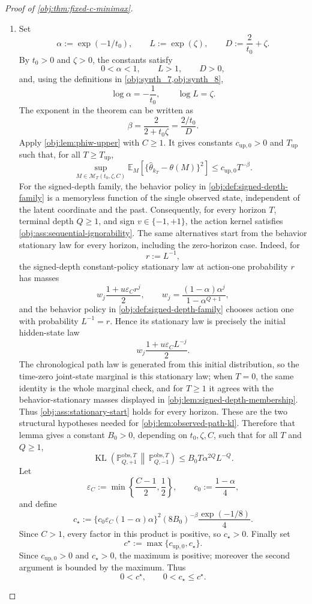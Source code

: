 \begin{proof}[Proof of \cref{obj:thm:fixed-c-minimax}]
\begin{enumerate}
\item Set
\[
\alpha:=\exp(-1/t_0),
\qquad
L:=\exp(\zeta),
\qquad
D:=\frac{2}{t_0}+\zeta .
\]
By \(t_0>0\) and \(\zeta>0\), the constants satisfy
\[
0<\alpha<1,\qquad L>1,\qquad D>0,
\]
and, using the definitions in \cref{obj:synth_7,obj:synth_8},
\[
\log\alpha=-\frac1{t_0},
\qquad
\log L=\zeta .
\]
The exponent in the theorem can be written as
\[
\beta=\frac{2}{2+t_0\zeta}
      =\frac{2/t_0}{D}.
\]
Apply \cref{obj:lem:phiw-upper} with \(C\ge1\). It gives constants
\(c_{\mathrm{up},0}>0\) and \(T_{\mathrm{up}}\) such that, for all
\(T\ge T_{\mathrm{up}}\),
\[
\sup_{M\in\mathcal M_T(t_0,\zeta,C)}
\mathbb E_M\!\left[
\{\widehat\theta_{k_T}-\theta(M)\}^2
\right]
\le
c_{\mathrm{up},0}T^{-\beta}.
\]
For the signed-depth family, the behavior policy in \cref{obj:def:signed-depth-family} is a memoryless function of the single observed state, independent of the latent coordinate and the past. Consequently, for every horizon \(T\), terminal depth \(Q\ge1\), and sign \(v\in\{-1,+1\}\), the action kernel satisfies \cref{obj:ass:sequential-ignorability}. The same alternatives start from the behavior stationary law for every horizon, including the zero-horizon case. Indeed, for
\[
r:=L^{-1},
\]
the signed-depth constant-policy stationary law at action-one probability \(r\) has masses
\[
w_j\frac{1+u\varepsilon_C r^j}{2},
\qquad
w_j=\frac{(1-\alpha)\alpha^j}{1-\alpha^{Q+1}},
\]
and the behavior policy in \cref{obj:def:signed-depth-family} chooses action one with probability \(L^{-1}=r\). Hence its stationary law is precisely the initial hidden-state law
\[
w_j\frac{1+u\varepsilon_C L^{-j}}{2}.
\]
The chronological path law is generated from this initial distribution, so the time-zero joint-state marginal is this stationary law; when \(T=0\), the same identity is the whole marginal check, and for \(T\ge1\) it agrees with the behavior-stationary masses displayed in \cref{obj:lem:signed-depth-membership}. Thus \cref{obj:ass:stationary-start} holds for every horizon. These are the two structural hypotheses needed for \cref{obj:lem:observed-path-kl}. Therefore that lemma gives a constant \(B_0>0\), depending on \(t_0,\zeta,C\), such that for all \(T\) and \(Q\ge1\),
\[
\operatorname{KL}\!\left(
\mathbb P_{Q,+1}^{\mathrm{obs},T}
\,\middle\|\,
\mathbb P_{Q,-1}^{\mathrm{obs},T}
\right)
\le
B_0T\alpha^{2Q}L^{-Q}.
\]
Let
\[
\varepsilon_C:=\min\left\{\frac{C-1}{2},\frac12\right\},
\qquad
c_0:=\frac{1-\alpha}{4},
\]
and define
\[
c_\star:=
\{c_0\varepsilon_C(1-\alpha)\alpha\}^2
(8B_0)^{-\beta}\frac{\exp(-1/8)}{4}.
\]
Since \(C>1\), every factor in this product is positive, so \(c_\star>0\). Finally set
\[
c^\star:=\max\{c_{\mathrm{up},0},c_\star\}.
\]
Since \(c_{\mathrm{up},0}>0\) and \(c_\star>0\), the maximum is positive; moreover the second argument is bounded by the maximum. Thus
\[
0<c^\star,
\qquad
0<c_\star\le c^\star .
\] %


\end{enumerate}
\end{proof}
